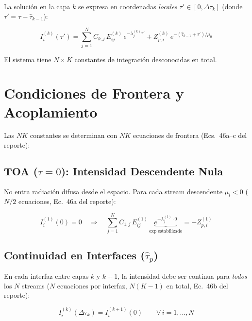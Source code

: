 \documentclass[a4paper,11pt]{article}
\begin{document}
La soluci\'on en la capa $k$ se expresa en coordenadas \emph{locales}
$\tau' \in [0, \Delta\tau_k]$ (donde $\tau' = \tau - \hat{\tau}_{k-1}$):

\begin{equation}\label{eq:layer_solution}
    I_i^{(k)}(\tau') = \sum_{j=1}^{N}C_{k,j}\,E^{(k)}_{ij}\,e^{-\lambda^{(k)}_j\tau'}
    + Z_{p,i}^{(k)}\,e^{-(\hat{\tau}_{k-1}+\tau')/\mu_0}
\end{equation}

El sistema tiene $N \times K$ constantes de integraci\'on desconocidas en total.


\section{Condiciones de Frontera y Acoplamiento}

Las $NK$ constantes se determinan con $NK$ ecuaciones de frontera
(Ecs.~46a--c del reporte):

\subsection{TOA ($\tau=0$): Intensidad Descendente Nula}

No entra radiaci\'on difusa desde el espacio.  Para cada stream descendente
$\mu_i < 0$ ($N/2$ ecuaciones, Ec.~46a del reporte):

\begin{equation}\label{eq:bc_toa}
    I_i^{(1)}(0) = 0 \quad\Longrightarrow\quad
    \sum_{j=1}^{N}C_{1,j}\,E^{(1)}_{ij}\,\underbrace{e^{-\lambda^{(1)}_j\cdot 0}}_{\text{exp estabilizado}}
    = -Z_{p,i}^{(1)}
\end{equation}

\subsection{Continuidad en Interfaces ($\hat{\tau}_p$)}

En cada interfaz entre capas $k$ y $k+1$, la intensidad debe ser continua
para \emph{todos} los $N$ streams ($N$ ecuaciones por interfaz,
$N(K-1)$ en total, Ec.~46b del reporte):

\begin{equation}\label{eq:bc_interface}
    I_i^{(k)}(\Delta\tau_k) = I_i^{(k+1)}(0) \qquad \forall\,i=1,\ldots,N
\end{equation}
\end{document}
